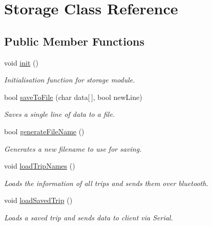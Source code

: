 \hypertarget{class_storage}{}\section{Storage Class Reference}
\label{class_storage}
\subsection*{Public Member Functions}
\begin{DoxyCompactItemize}
\item 
void \hyperlink{class_storage_a98b01eb20a64a4bf4127685147f7f6f1}{init} ()
\begin{DoxyCompactList}\small\item\em Initialisation function for storage module. \end{DoxyCompactList}\item 
bool \hyperlink{class_storage_a044a17325b2917afca49aa19ddb488f6}{save\+To\+File} (char data\mbox{[}$\,$\mbox{]}, bool new\+Line)
\begin{DoxyCompactList}\small\item\em Saves a single line of data to a file. \end{DoxyCompactList}\item 
bool \hyperlink{class_storage_a571ce9630665d9407ffbaeff55c47b0a}{generate\+File\+Name} ()
\begin{DoxyCompactList}\small\item\em Generates a new filename to use for saving. \end{DoxyCompactList}\item 
void \hyperlink{class_storage_a4831b2e8ecfa22da6971f5a8690cc4e3}{load\+Trip\+Names} ()
\begin{DoxyCompactList}\small\item\em Loads the information of all trips and sends them over bluetooth. \end{DoxyCompactList}\item 
void \hyperlink{class_storage_af56ca8289ed925300e3385114c561eec}{load\+Saved\+Trip} ()
\begin{DoxyCompactList}\small\item\em Loads a saved trip and sends data to client via Serial. \end{DoxyCompactList}\end{DoxyCompactItemize}
